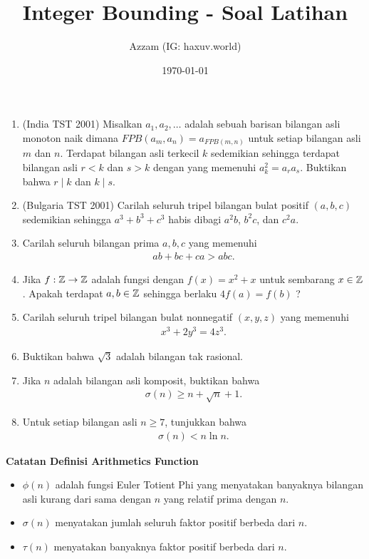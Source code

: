 \documentclass[12pt]{scrartcl}
\title{Integer Bounding - Soal Latihan}
\author{Azzam (IG: haxuv.world)}
\date{\today}
\begin{document}
\maketitle

\renewcommand*\contentsname{Daftar Isi}
\tableofcontents

\newpage
\begin{enumerate}
    \item (India TST 2001) Misalkan $a_1,a_2,\dots$ adalah sebuah barisan bilangan asli monoton naik dimana $FPB(a_m,a_n)=a_{FPB(m,n)}$ untuk setiap bilangan asli $m$ dan $n$. Terdapat bilangan asli terkecil $k$ sedemikian sehingga terdapat bilangan asli $r<k$ dan $s>k$ dengan yang memenuhi $a_k^2=a_ra_s$. Buktikan bahwa $r \mid k$ dan $k \mid s$.

    \item (Bulgaria TST 2001) Carilah seluruh tripel bilangan bulat positif $(a,b,c)$ sedemikian sehingga $a^3+b^3+c^3$ habis dibagi $a^2b$, $b^2c$, dan $c^2a$.

    \item Carilah seluruh bilangan prima $a,b,c$ yang memenuhi
    \begin{align*}
        ab+bc+ca > abc.
    \end{align*}
    
    \item Jika $f: \mathbb Z \to \mathbb Z$ adalah fungsi dengan $f(x)=x^2+x$ untuk sembarang $x \in \mathbb Z$. Apakah terdapat $a,b \in \mathbb Z$ sehingga berlaku $4f(a)=f(b)$ ?
    
    \item Carilah seluruh tripel bilangan bulat nonnegatif $(x,y,z)$ yang memenuhi
    \begin{align*}
        x^3+2y^3=4z^3.
    \end{align*}

    \item Buktikan bahwa $\sqrt{3}$ adalah bilangan tak rasional.
    
    \item Jika $n$ adalah bilangan asli komposit, buktikan bahwa
    \begin{align*}
        \sigma(n) \ge n + \sqrt{n} + 1.
    \end{align*}

    \item Untuk setiap bilangan asli $n \ge 7$, tunjukkan bahwa
    \begin{align*}
        \sigma(n) < n \ln n.
    \end{align*}
\end{enumerate}

\newpage
\textbf{Catatan Definisi Arithmetics Function}
\begin{itemize}
    \item $\phi(n)$ adalah fungsi Euler Totient Phi yang menyatakan banyaknya bilangan asli kurang dari sama dengan $n$ yang relatif prima dengan $n$.
    \item $\sigma(n)$ menyatakan jumlah seluruh faktor positif berbeda dari $n$.
    \item $\tau(n)$ menyatakan banyaknya faktor positif berbeda dari $n$.
\end{itemize}
\end{document}
